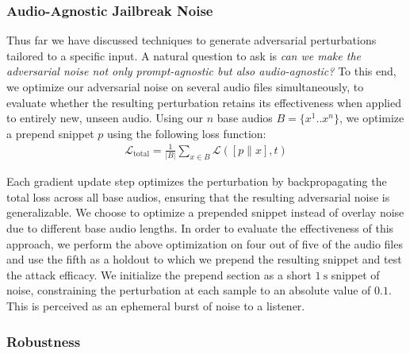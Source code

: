 
\subsubsection{Audio-Agnostic Jailbreak Noise}

Thus far we have discussed techniques to generate adversarial perturbations tailored to a specific input. A natural question to ask is \textit{can we make the adversarial noise not only prompt-agnostic but also audio-agnostic?} To this end, we optimize our adversarial noise on several audio files simultaneously, to evaluate whether the resulting perturbation retains its effectiveness when applied to entirely new, unseen audio. Using our $n$ base audios $B = \{x^1..x^n\}$, we optimize a prepend snippet $p$ using the following loss function:\begin{gather*}
  \mathcal{L}_{\text{total}} = \frac{1}{|B|} \sum_{x \in B} \mathcal{L}([p \| x], t)  
\end{gather*}

Each gradient update step optimizes the perturbation by backpropagating the total loss across all base audios, ensuring that the resulting adversarial noise is generalizable. We choose to optimize a prepended snippet instead of overlay noise due to different base audio lengths. In order to evaluate the effectiveness of this approach, we perform the above optimization on four out of five of the audio files and use the fifth as a holdout to which we prepend the resulting snippet and test the attack efficacy. We initialize the prepend section as a short $\SI{1}{\second}$ snippet of noise, constraining the perturbation at each sample to an absolute value of $0.1$. This is perceived as an ephemeral burst of noise to a listener.

\subsubsection{Robustness}

